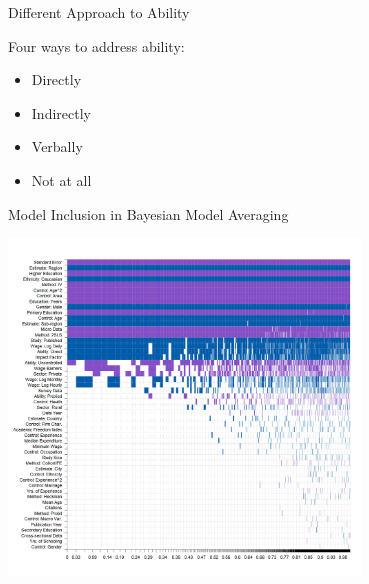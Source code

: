 \documentclass{beamer} %
\begin{document}
\begin{frame}{Different Approach to Ability}

  \begin{block}{Four ways to address ability:}
    \begin{itemize}
      \item Directly
      \item Indirectly
      \item Verbally
      \item Not at all
    \end{itemize}
  \end{block}


\end{frame}

\begin{frame}{Model Inclusion in Bayesian Model Averaging}
  \begin{center}
    \includegraphics[width=0.7\textwidth]{Figures/bma_UIP_dilut_results.png}
  \end{center}
\end{frame}




\end{document}

